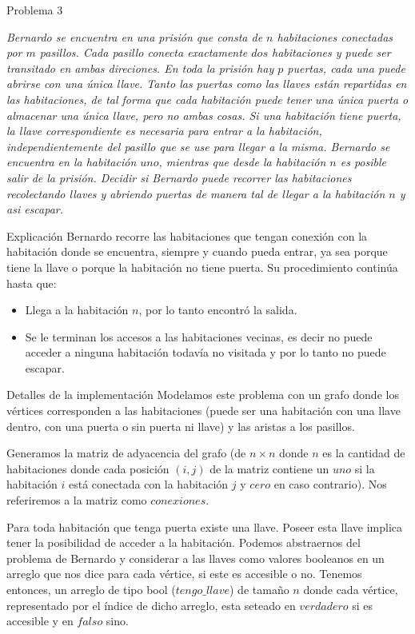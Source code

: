 \begin{section}{Problema 3}

	\textit{Bernardo se encuentra en una prisión que consta de $n$ habitaciones conectadas por $m$ pasillos. Cada pasillo conecta exactamente $dos$ habitaciones y puede ser transitado en ambas direciones. En toda la prisión hay $p$ puertas, cada una puede abrirse con una única llave. Tanto las puertas como las llaves están repartidas en las habitaciones, de tal forma que cada habitación puede tener una única puerta o almacenar una única llave, pero no ambas cosas. Si una habitación tiene puerta, la llave correspondiente es necesaria para entrar a la habitación, independientemente del pasillo que se use para llegar a la misma. Bernardo se encuentra en la habitación $uno$, mientras que desde la habitación $n$ es posible salir de la prisión. Decidir si Bernardo puede recorrer las habitaciones recolectando llaves y abriendo puertas de manera tal de llegar a la habitación $n$ y asi escapar.}
		
	\begin{subsection}{Explicación}
		Bernardo recorre las habitaciones que tengan conexión con la habitación donde se encuentra, siempre y cuando pueda entrar, ya sea porque tiene la llave o porque la habitación no tiene puerta. Su procedimiento continúa hasta que:
		\begin{itemize}
			\item Llega a la habitación $n$, por lo tanto encontró la salida.
			\item Se le terminan los accesos a las habitaciones vecinas, es decir no puede acceder a ninguna habitación todavía no visitada y por lo tanto no puede escapar.
		\end{itemize}

	\end{subsection}

	\begin{subsection}{Detalles de la implementación}
		Modelamos este problema con un grafo donde los vértices corresponden a las habitaciones (puede ser una habitación con una llave dentro, con una puerta o sin puerta ni llave) y las aristas a los pasillos.	

		Generamos la matriz de adyacencia del grafo (de $n\times n$ donde $n$ es la cantidad de habitaciones donde cada posición $(i,j)$ de la matriz contiene un $uno$ si la habitación $i$ está conectada con la habitación $j$ y $cero$ en caso contrario). Nos referiremos a la matriz como $conexiones$.

		Para toda habitación que tenga puerta existe una llave. Poseer esta llave implica tener la posibilidad de acceder a la habitación. Podemos abstraernos del problema de Bernardo y considerar a las llaves como valores booleanos en un arreglo que nos dice para cada vértice, si este es accesible o no. Tenemos entonces, un arreglo de tipo bool ($tengo\_llave$) de tamaño $n$ donde cada vértice, representado por el índice de dicho arreglo, esta seteado en $verdadero$ si es accesible y en $falso$ sino.


\end{subsection}
\end{section}
